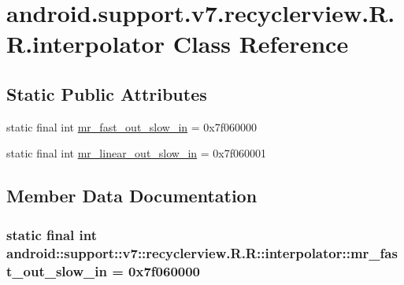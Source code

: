 \hypertarget{classandroid_1_1support_1_1v7_1_1recyclerview_1_1_r_1_1interpolator}{
\section{android.support.v7.recyclerview.R.R.interpolator Class Reference}
\label{classandroid_1_1support_1_1v7_1_1recyclerview_1_1_r_1_1interpolator}
}
\subsection*{Static Public Attributes}
\begin{CompactItemize}
\item 
static final int \hyperlink{classandroid_1_1support_1_1v7_1_1recyclerview_1_1_r_1_1interpolator_c1f6decace29ec1b0689959aa506c312}{mr\_\-fast\_\-out\_\-slow\_\-in} = 0x7f060000
\item 
static final int \hyperlink{classandroid_1_1support_1_1v7_1_1recyclerview_1_1_r_1_1interpolator_0081d5709e39b13c119a3294a93fd434}{mr\_\-linear\_\-out\_\-slow\_\-in} = 0x7f060001
\end{CompactItemize}


\subsection{Member Data Documentation}
\hypertarget{classandroid_1_1support_1_1v7_1_1recyclerview_1_1_r_1_1interpolator_c1f6decace29ec1b0689959aa506c312}{
\subsubsection[{mr\_\-fast\_\-out\_\-slow\_\-in}]{\setlength{\rightskip}{0pt plus 5cm}static final int android::support::v7::recyclerview.R.R::interpolator::mr\_\-fast\_\-out\_\-slow\_\-in = 0x7f060000}}
\label{classandroid_1_1support_1_1v7_1_1recyclerview_1_1_r_1_1interpolator_c1f6decace29ec1b0689959aa506c312}


